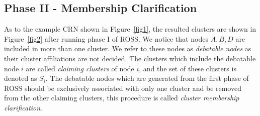 \documentclass[times]{ettauth}
\theoremstyle{mytheoremstyle}
\theoremstyle{mytheoremstyle}
\theoremstyle{mytheoremstyle}
\begin{document}
\subsection{Phase II - Membership Clarification}
\label{membershipClarification}
As to the example CRN shown in Figure~\ref{fig1}, the resulted clusters are shown in Figure~\ref{fig2} after running phase I of ROSS.
We notice that nodes $A, B, D$ are included in more than one cluster. 
We refer to these nodes as \textit{debatable nodes} as their cluster affiliations are not decided.
The clusters which include the debatable node $i$ are called \textit{claiming clusters} of node $i$, and the set of these clusters is denoted as $S_i$.  
The debatable nodes which are generated from the first phase of ROSS should be exclusively associated with only one cluster and be removed from the other claiming clusters, this procedure is called \textit{cluster membership clarification}.


%

\end{document}
